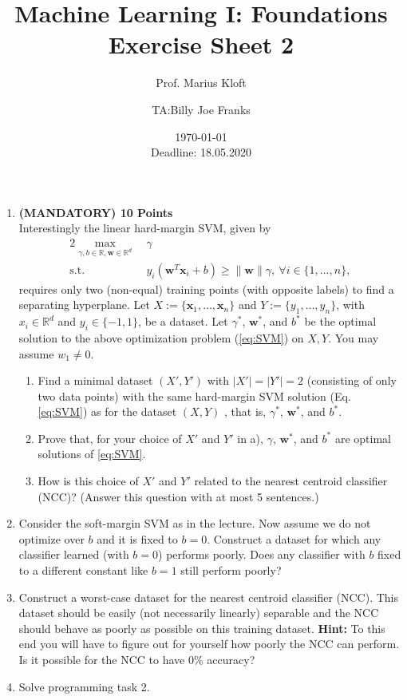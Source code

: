 \documentclass[]{scrartcl}
\author{Prof. Marius Kloft \and TA:Billy Joe Franks}
\title{Machine Learning I: Foundations \\ Exercise Sheet 2}
\date{\today\\Deadline: 18.05.2020}
\newcommand{\R}{\mathbb{R}}
\newcommand{\bx}{\mathbf{x}}
\newcommand{\bw}{\mathbf{w}}
\begin{document}
\maketitle

\begin{enumerate}

\item \textbf{(MANDATORY) 10 Points}\\
Interestingly the linear hard-margin SVM, given by 
\begin{alignat}{2}
	\label{eq:SVM}
   \max_{\gamma, b\in \R, \bw \in \R^d}~&  \gamma\\
   \text{s.t.}~  & y_i(\bw^T\bx_i+b) \geq \lVert\bw\rVert\gamma,~\forall i\in\{1,\dots,n\}\nonumber,
\end{alignat}
requires only two (non-equal) training points (with opposite labels) to find a separating hyperplane. 
Let $X:=\{\bx_1, \dots, \bx_n\}$ and $Y:=\{y_1, \dots, y_n\}$, with $x_i \in \R^d$ and $y_i \in \{-1, 1\}$, be a dataset. Let $\gamma^*$, $\bw^*$, and $b^*$ be the optimal solution to the above optimization problem (\ref{eq:SVM}) on $X, Y$. You may assume $w_1\neq0$.
\begin{enumerate}
\item Find a minimal dataset $(X',Y')$ with $|X'|=|Y'|=2$ (consisting of only two data points) with the same hard-margin SVM solution (Eq. \eqref{eq:SVM}) as for the dataset $(X, Y)$ , that is, $\gamma^*$, $\bw^*$, and $b^*$.
\item Prove that, for your choice of $X'$ and $Y'$ in a), $\gamma$, $\bw^*$, and $b^*$ are optimal solutions of \eqref{eq:SVM}.
\item How is this choice of $X'$ and $Y'$ related to the nearest centroid classifier (NCC)? (Answer this question with at most 5 sentences.)
\end{enumerate}

\item Consider the soft-margin SVM as in the lecture. Now assume we do not optimize over $b$ and it is fixed to $b=0$. Construct a dataset for which any classifier learned (with $b=0$) performs poorly. Does any classifier with $b$ fixed to a different constant like $b=1$ still perform poorly?

\newpage
\item Construct a worst-case dataset for the nearest centroid classifier (NCC). This dataset should be easily (not necessarily linearly) separable and the NCC should behave as poorly as possible on this training dataset. \textbf{Hint:} To this end you will have to figure out for yourself how poorly the NCC can perform. Is it possible for the NCC to have $0\%$ accuracy?

\item Solve programming task 2.
\end{enumerate}
\end{document}
